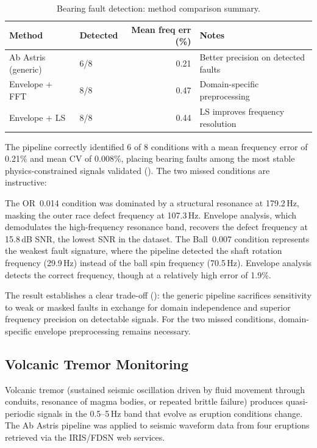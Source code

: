 \documentclass[11pt,a4paper]{article}
\begin{document}
\begin{table}[htbp]
\centering
\caption{Bearing fault detection: method comparison summary.}
\label{tab:cwru-comparison}
\smallskip
\begin{tabular}{llrl}
\toprule
\textbf{Method} & \textbf{Detected} & \textbf{Mean freq err (\%)} & \textbf{Notes} \\
\midrule
Ab Astris (generic)  & 6/8 & 0.21 & Better precision on detected faults \\
Envelope + FFT       & 8/8 & 0.47 & Domain-specific preprocessing \\
Envelope + LS        & 8/8 & 0.44 & LS improves frequency resolution \\
\bottomrule
\end{tabular}
\end{table}

The pipeline correctly identified 6 of 8 conditions with a mean frequency error of 0.21\% and mean CV of 0.008\%, placing bearing faults among the most stable physics-constrained signals validated (). The two missed conditions are instructive:

The OR~0.014\textquotedbl{}{} condition was dominated by a structural resonance at 179.2\,Hz, masking the outer race defect frequency at 107.3\,Hz. Envelope analysis, which demodulates the high-frequency resonance band, recovers the defect frequency at 15.8\,dB SNR, the lowest SNR in the dataset. The Ball~0.007\textquotedbl{}{} condition represents the weakest fault signature, where the pipeline detected the shaft rotation frequency (29.9\,Hz) instead of the ball spin frequency (70.5\,Hz). Envelope analysis detects the correct frequency, though at a relatively high error of 1.9\%.

The result establishes a clear trade-off (): the generic pipeline sacrifices sensitivity to weak or masked faults in exchange for domain independence and superior frequency precision on detectable signals. For the two missed conditions, domain-specific envelope preprocessing remains necessary.

\subsection{Volcanic Tremor Monitoring}
\label{sec:volcanic}

Volcanic tremor (sustained seismic oscillation driven by fluid movement through conduits, resonance of magma bodies, or repeated brittle failure) produces quasi-periodic signals in the 0.5--5\,Hz band that evolve as eruption conditions change. The Ab Astris pipeline was applied to seismic waveform data from four eruptions retrieved via the IRIS/FDSN web services.
\end{document}
